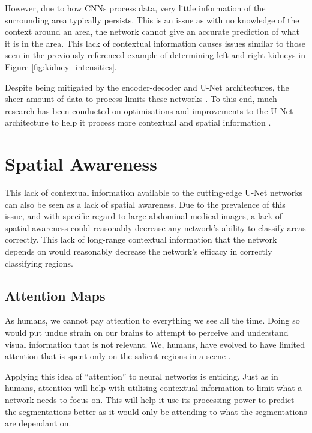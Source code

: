 \documentclass{l4proj}
\begin{document}
However, due to how CNNs process data, very little information of the surrounding area typically persists. This is an issue as with no knowledge of the context around an area, the network cannot give an accurate prediction of what it is in the area. This lack of contextual information causes issues similar to those seen in the previously referenced example of determining left and right kidneys in Figure \ref{fig:kidney_intensities}.

Despite being mitigated by the encoder-decoder and U-Net architectures, the sheer amount of data to process limits these networks \citep{tian2019automatic}. To this end, much research has been conducted on optimisations and improvements to the U-Net architecture to help it process more contextual and spatial information \citep{rahman2022brain, zhang2021cr}.

\section{Spatial Awareness}

This lack of contextual information available to the cutting-edge U-Net networks can also be seen as a lack of spatial awareness. Due to the prevalence of this issue, and with specific regard to large abdominal medical images, a lack of spatial awareness could reasonably decrease any network’s ability to classify areas correctly. This lack of long-range contextual information that the network depends on would reasonably decrease the network’s efficacy in correctly classifying regions.

\subsection{Attention Maps}

As humans, we cannot pay attention to everything we see all the time. Doing so would put undue strain on our brains to attempt to perceive and understand visual information that is not relevant. We, humans, have evolved to have limited attention that is spent only on the salient regions in a scene \citep{boynton2005attention}.

Applying this idea of “attention” to neural networks is enticing. Just as in humans, attention will help with utilising contextual information to limit what a network needs to focus on. This will help it use its processing power to predict the segmentations better as it would only be attending to what the segmentations are dependant on.
\end{document}

